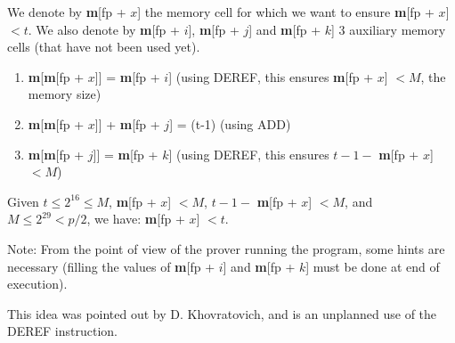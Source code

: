 \documentclass{article}
\theoremstyle{definition}
\begin{document}
We denote by \textbf{m}[fp + $x$] the memory cell for which we want to ensure \textbf{m}[fp + $x$] $< t$.
We also denote by \textbf{m}[fp + $i$], \textbf{m}[fp + $j$] and \textbf{m}[fp + $k$] 3 auxiliary memory cells (that have not been used yet).
\begin{enumerate}
    \item \textbf{m}[\textbf{m}[fp + $x$]] = \textbf{m}[fp + $i$] (using DEREF, this ensures \textbf{m}[fp + $x$] $ < M$, the memory size)
    \item \textbf{m}[\textbf{m}[fp + $x$]] + \textbf{m}[fp + $j$] = (t-1) (using ADD)
        \item \textbf{m}[\textbf{m}[fp + $j$]] = \textbf{m}[fp + $k$] (using DEREF, this ensures $t - 1 - $ \textbf{m}[fp + $x$] $ < M$)
\end{enumerate}

Given $t \leq 2^{16} \leq M$, \textbf{m}[fp + $x$] $ < M$, $t - 1 - $ \textbf{m}[fp + $x$] $< M$, and $M \leq 2^{29} < p / 2$, we have: \textbf{m}[fp + $x$] $ < t$.

Note: From the point of view of the prover running the program, some hints are necessary (filling the values of \textbf{m}[fp + $i$] and \textbf{m}[fp + $k$] must be done at end of execution).

This idea was pointed out by D. Khovratovich, and is an unplanned use of the DEREF instruction.
\end{document}
